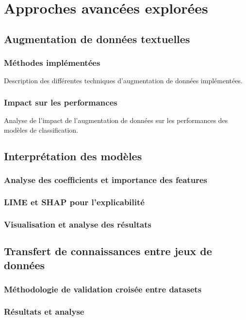 \documentclass[a4paper,11pt]{article}
\begin{document}
\section{Approches avancées explorées}
\label{sec:advanced}

\subsection{Augmentation de données textuelles}
\subsubsection{Méthodes implémentées}
Description des différentes techniques d'augmentation de données implémentées.

\subsubsection{Impact sur les performances}
Analyse de l'impact de l'augmentation de données sur les performances des modèles de classification.

\subsection{Interprétation des modèles}
\subsubsection{Analyse des coefficients et importance des features}
\subsubsection{LIME et SHAP pour l'explicabilité}
\subsubsection{Visualisation et analyse des résultats}

\subsection{Transfert de connaissances entre jeux de données}
\subsubsection{Méthodologie de validation croisée entre datasets}
\subsubsection{Résultats et analyse}
\end{document}
